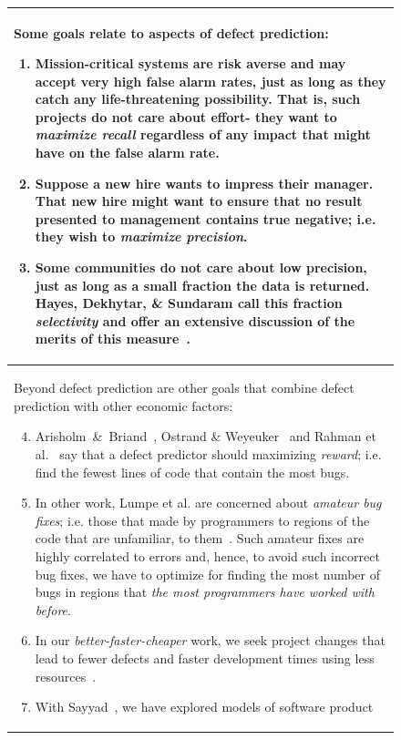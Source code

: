 \documentclass[table, xcdraw, sigconf,review, anonymous]{acmart}
\begin{document}
\begin{figure}[!t]
\small

\begin{tabular}{p{.95\linewidth}}\hline 
\rowcolor{gray!20}
Some goals relate to aspects of defect prediction:
\begin{enumerate}[leftmargin=0.4cm]
 
\item
Mission-critical systems are risk averse and may accept very high false alarm rates,
just as long as they catch any life-threatening possibility. That is, such projects
do not care about effort- they want to {\em maximize recall} regardless of any impact
that might have on the false alarm rate.
\item  Suppose a new hire wants
 to impress their manager. That
 new hire might want to ensure that no result presented to  management contains  true negative;
i.e. they wish to {\em maximize precision}.
\item
Some communities do not care about   low precision,
just as long as a small fraction the data is returned. Hayes, Dekhytar, \& Sundaram call this fraction
{\em selectivity} and offer an
extensive discussion of the merits of this measure~\cite{hayes06}.
\end{enumerate}
 \\ \hline
\rowcolor{gray!20}
Beyond defect prediction are other goals that combine defect prediction with other economic
factors:
\begin{enumerate}[leftmargin=0.4cm]
\setcounter{enumi}{3}
\item
Arisholm~\&~Briand~\cite{arisholm06},  Ostrand \& Weyeuker~\cite{ostrand04} and Rahman et al.~\cite{rahman12}
say that a defect predictor should maximizing {\em reward}; i.e. find the fewest lines of code
that contain the most bugs.
\item In other work, Lumpe et al. are concerned about
 {\em amateur  bug fixes}; i.e. those that made by programmers to
regions of the code that are unfamiliar, to them~\cite{me11f}.
Such amateur fixes are highly correlated to errors and, hence, to
avoid such incorrect bug fixes, we have to optimize
for finding the most number of bugs in regions that {\em the most programmers have worked with before}.
\item In our  {\em better-faster-cheaper} work, we seek  project changes that lead
to fewer defects and faster development times using less resources~\cite{elrawas10,me07f,me09a,me09f}.
\item
With Sayyad~\cite{sayyad13a,sayyad13b}, we have explored models of software product

\end{enumerate}
\end{tabular}
\end{figure}
\end{document}

